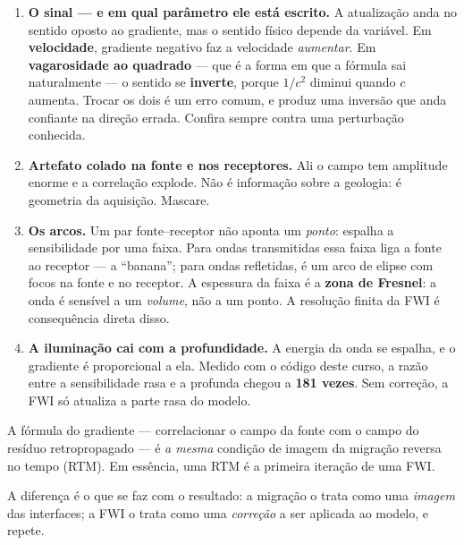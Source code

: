 \documentclass[11pt,a4paper,oneside]{report}
\begin{document}
\begin{enumerate}[leftmargin=*]
\item \textbf{O sinal --- e em qual par\^ametro ele est\'a escrito.} A
atualiza\c{c}\~ao anda no sentido oposto ao gradiente, mas o sentido f\'isico
depende da vari\'avel. Em \textbf{velocidade}, gradiente negativo faz a
velocidade \emph{aumentar}. Em \textbf{vagarosidade ao quadrado} --- que \'e a
forma em que a f\'ormula sai naturalmente --- o sentido se \textbf{inverte},
porque $1/c^2$ diminui quando $c$ aumenta. Trocar os dois \'e um erro comum,
e produz uma invers\~ao que anda confiante na dire\c{c}\~ao errada. Confira
sempre contra uma perturba\c{c}\~ao conhecida.
\item \textbf{Artefato colado na fonte e nos receptores.} Ali o campo tem
amplitude enorme e a correla\c{c}\~ao explode. N\~ao \'e informa\c{c}\~ao
sobre a geologia: \'e geometria da aquisi\c{c}\~ao. Mascare.
\item \textbf{Os arcos.} Um par fonte--receptor n\~ao aponta um \emph{ponto}:
espalha a sensibilidade por uma faixa. Para ondas transmitidas essa faixa liga
a fonte ao receptor --- a ``banana''; para ondas refletidas, \'e um arco de
elipse com focos na fonte e no receptor. A espessura da faixa \'e a
\textbf{zona de Fresnel}: a onda \'e sens\'ivel a um \emph{volume}, n\~ao a um
ponto. A resolu\c{c}\~ao finita da FWI \'e consequ\^encia direta disso.
\item \textbf{A ilumina\c{c}\~ao cai com a profundidade.} A energia da onda se
espalha, e o gradiente \'e proporcional a ela. Medido com o c\'odigo deste
curso, a raz\~ao entre a sensibilidade rasa e a profunda chegou a
\textbf{181 vezes}. Sem corre\c{c}\~ao, a FWI s\'o atualiza a parte rasa do
modelo.
\end{enumerate}

\begin{pratica}
A f\'ormula do gradiente --- correlacionar o campo da fonte com o campo do
res\'iduo retropropagado --- \'e \emph{a mesma} condi\c{c}\~ao de imagem da
migra\c{c}\~ao reversa no tempo (RTM). Em ess\^encia, uma RTM \'e a primeira
itera\c{c}\~ao de uma FWI.

A diferen\c{c}a \'e o que se faz com o resultado: a migra\c{c}\~ao o trata
como uma \emph{imagem} das interfaces; a FWI o trata como uma
\emph{corre\c{c}\~ao} a ser aplicada ao modelo, e repete.
\end{pratica}
\end{document}
